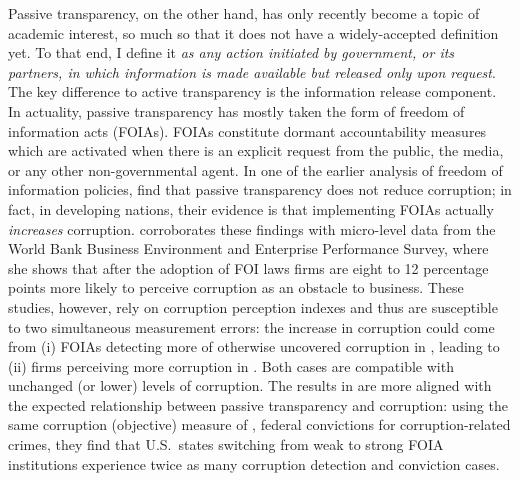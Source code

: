 \documentclass[11pt]{article}
\begin{document}
Passive transparency, on the other hand, has only recently become a topic of academic interest, so much so that it does not have a widely-accepted definition yet. To that end, I define it \emph{as any action initiated by government, or its partners, in which information is made available but released only upon request}. The key difference to active transparency is the information release component. In actuality, passive transparency has mostly taken the form of freedom of information acts (FOIAs). FOIAs constitute dormant accountability measures which are activated when there is an explicit request from the public, the media, or any other non-governmental agent. In one of the earlier analysis of freedom of information policies, \citet{EscalerasFreedominformationacts2010} find that passive transparency does not reduce corruption; in fact, in developing nations, their evidence is that implementing FOIAs actually \emph{increases} corruption. \citet{CostaFreedomInformationLaws2013} corroborates these findings with micro-level data from the World Bank Business Environment and Enterprise Performance Survey, where she shows that after the adoption of FOI laws firms are eight to 12 percentage points more likely to perceive corruption as an obstacle to business. These studies, however, rely on corruption perception indexes and thus are susceptible to two simultaneous measurement errors: the increase in corruption could come from (i) FOIAs detecting more of otherwise uncovered corruption in \citet{EscalerasFreedominformationacts2010}, leading to (ii) firms perceiving more corruption in \citet{CostaFreedomInformationLaws2013}. Both cases are compatible with unchanged (or lower) levels of corruption. The results in \citet{CordisSunshineDisinfectantEffect2014} are more aligned with the expected relationship between passive transparency and corruption: using the same corruption (objective) measure of \citet{CampanteIsolatedCapitalCities2014}, federal convictions for corruption-related crimes, they find that U.S.~states switching from weak to strong FOIA institutions experience twice as many corruption detection and conviction cases.
\end{document}
